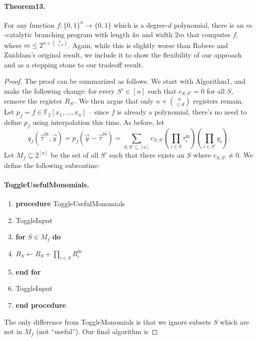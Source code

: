 \documentclass[10pt,a4paper]{article}
\begin{document}
\paragraph{Theorem13.} For any function $f:\{0,1\}^n\to\{0,1\}$ which is a degree-$d$ polynomial, there is an $m$-catalytic branching program with length $4n$ and width $2m$ that computes $f$, where $m\leq2^{n+\binom n{\leq d}}$.
Again, while this is slightly worse than Robere and Zuiddam's original result, we include it to show the flexibility of our approach and as a stepping stone to our tradeoff result.
\begin{proof}
The proof can be summarized as follows. We start with Algorithm1, and make the following change: for every $S'\in[n]$ such that $c_{S,S'}=0$ for all $S$, remove the register $R_{S'}$. We then argue that only $n+\binom n{\leq d}$ registers remain.
Let $p_f=f\in\mathbb F_2[x_1,\ldots,x_n]$ – since $f$ is already a polynomial, there's no need to define $p_f$ using interpolation this time. As before, let
\[q_f(\vec\tau^{\mathrm{in}},\vec y)=p_f(\vec y-\vec\tau^{\mathrm{in}})=\sum_{S,S'\subseteq[n]}c_{S,S'}\left(\prod_{i\in S}\tau_i^{\mathrm{in}}\right)\left(\prod_{i\in S'}y_i\right).\]
Let $M_f\subseteq2^{[n]}$ be the set of all $S'$ such that there exists an $S$ where $c_{S,S'}\neq0$. We define the following subroutine:
\paragraph{ToggleUsefulMonomials.}
\begin{enumerate}[label=\arabic*:]
\item \textbf{procedure} ToggleUsefulMonomials
\item ToggleInput
\item \textbf{for} $S\in M_f$ \textbf{do}
\item $R_S\leftarrow R_S+\prod_{i\in S}R_i^{\mathrm{in}}$
\item \textbf{end for}
\item ToggleInput
\item \textbf{end procedure}
\end{enumerate}
The only difference from ToggleMonomials is that we ignore subsets $S$ which are not in $M_f$ (not ``useful''). Our final algorithm is

\end{proof}
\end{document}
